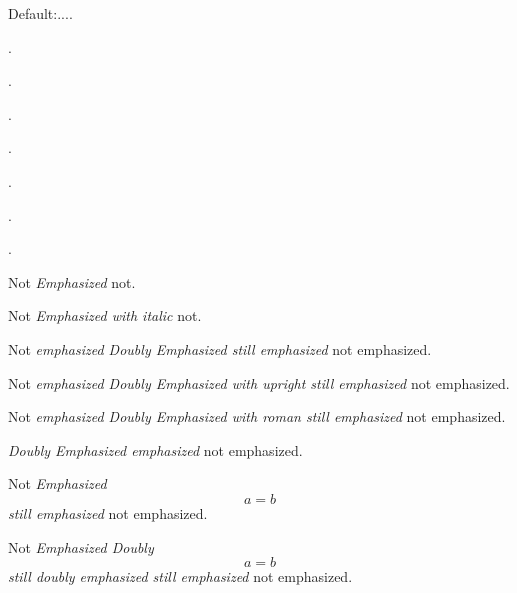 \documentclass{article}
\begin{document}
\makeatletter
Default:\f@family.\f@series.\f@shape.\f@size.

\f@shape\emph{\f@shape\emph{\f@shape}\f@shape}\f@shape.

\f@shape\textit{\f@shape\emph{\f@shape}\f@shape}\f@shape.

\f@shape\emph{\f@shape\textit{\f@shape}\f@shape}\f@shape.

\f@shape\textup{\f@shape\emph{\f@shape}\f@shape}\f@shape.

\f@shape\emph{\f@shape\textup{\f@shape}\f@shape}\f@shape.

\f@shape\textrm{\f@shape\emph{\f@shape}\f@shape}\f@shape.

\f@shape\emph{\f@shape\textrm{\f@shape}\f@shape}\f@shape.

Not \emph{Emphasized} not.

Not \emph{Emphasized \textit{with italic}} not.

Not \emph{emphasized \emph{Doubly Emphasized} still emphasized} not emphasized.

Not \emph{emphasized \emph{Doubly Emphasized \textrm{with upright}} still emphasized} not emphasized.

Not \emph{emphasized \emph{Doubly Emphasized \textrm{with roman}} still emphasized} not emphasized.

\emph{\emph{Doubly Emphasized} emphasized} not emphasized.


Not \emph{Emphasized
  \[ a=b\]
  still emphasized} not emphasized.

Not \emph{Emphasized \emph{Doubly
  \[ a=b\]
  still doubly emphasized} still emphasized} not emphasized.
\end{document}
